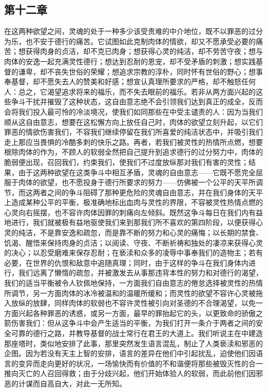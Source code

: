 
\subsection{第十二章}

\par

在这两种欲望之间，灵魂的处于一种多少该受责难的中介地位，既不以罪恶的过分为乐，也不安于德行的痛苦。它试图如此克制肉体的情欲，却又不愿承受必要的痛苦；想获得肉身的贞洁，却不克已肉身；想获得心灵的纯洁，却不劳苦守夜；想与肉体的安逸一起充满灵性德行；想达到忍耐的恩宠，却不受矛盾的刺激；想实践基督的谦卑，却不丧失世俗的荣耀；想追求宗教的淳朴，同时怀有世俗的野心；想事奉基督，却不愿失去人的赞美和好感；想宣认真理所要求的严格，却不触怒任何人：总之，它渴望追求将来的福乐，而不失去眼前的福乐。若非从两方面兴起的这些争斗干扰并摧毁了这种状态，这自由意志绝不会引领我们达到真正的成全，反而会将我们投入最可怜的冷淡境况，使我们如同那些在中受主谴责的人：因为当我们顺从这自由意志，想要在这松懈方向上放任自己时，肉体的欲望立刻升起，以它们罪恶的情欲伤害我们，不容我们继续停留在我们所喜爱的纯洁状态中，并吸引我们走上那应当畏惧的冷酷多刺的快乐之路。再者，若我们被灵性的热情所点燃，想要根除肉体的作为，不顾人的软弱全然把自己提升到追求德行的过分努力中，肉体的脆弱便出现，召回我们，约束我们，使我们不过度放纵那对我们有害的灵性；结果，由于这两种欲望在这类争斗中相互矛盾，灵魂的自由意志——它既不愿完全屈服于肉体的欲望，也不愿投身于德行所要求的努力——仿佛被一个公平的天平所调节，而这两者之间的争斗阻碍了那种更危险的灵魂自由意志，并在我们身体的天平上造成某种公平的平衡，极准确地标出血肉与灵性的界限，不容被灵性热情点燃的心灵向右摇摆，也不容许肉体因罪的刺痛向左倾斜。既然这争斗每日在我们内有益地进行，我们就被极有益地驱使我们来到那我们所不喜欢的第四阶段，以便获得心灵的纯洁，不是靠安逸和疏忽，而是靠不断的努力和心灵的痛悔；以长期的禁食、饥渴、醒悟来保持肉身的贞洁；以阅读、守夜、不断祈祷和独处的凄凉来获得心灵的决心；以忍受磨难来保存忍耐；在亵渎和众多的凌辱中事奉我们的造物主；若有必要，在世界的仇恨和敌意中追随真理；同时，由于这样的争斗在我们身体内进行，我们远离了懒惰的疏忽，并被激发去从事那违背本性的努力和对德行的渴望，我们的适当平衡被令人钦佩地保持，一方面我们自由意志的倦怠选择被灵性的热情所调节，另一方面肉体的冰冷被温和的温暖所缓和；而灵性的欲望不容许心灵被拖入放纵的放肆，同样肉体的软弱也不容许灵性被引向对圣德的不合理渴望，以免一方面兴起各种罪恶的诱惑，或另一方面，最早的罪抬起它的头，以更致命的骄傲之箭伤害我们：但从这争斗中会产生适当的平衡，为我们打开一条介于两者之间的安全可靠的德行之路，并教导基督的战士常行在君王的大道上。我们听说主在中建造那座塔时，类似地安排了此事，那里突然发生语言混乱，制止了人类亵渎和邪恶的企图。因为若没有天主上智的安排，语言的差异在他们中引起扰乱，迫使他们因语言的变异而走向更好的状况，一场愉快而有价值的不和谐便将那些被毁灭性的合一推向灭亡的人召回得救；由于分歧兴起，他们开始体验人的软弱，而此前他们因邪恶的计谋而自高自大，对此一无所知。\par


